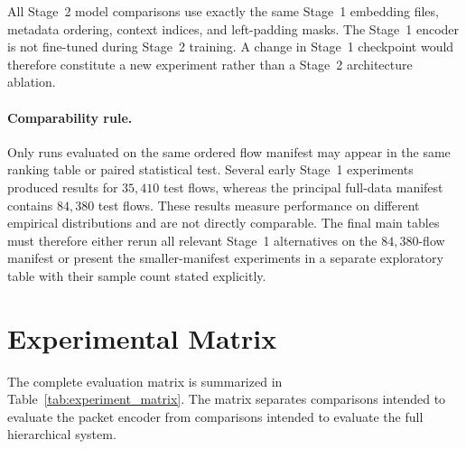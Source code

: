 All Stage~2 model comparisons use exactly the same Stage~1 embedding files,
metadata ordering, context indices, and left-padding masks. The Stage~1 encoder
is not fine-tuned during Stage~2 training. A change in Stage~1 checkpoint would
therefore constitute a new experiment rather than a Stage~2 architecture
ablation.

\paragraph{Comparability rule.}
Only runs evaluated on the same ordered flow manifest may appear in the same
ranking table or paired statistical test. Several early Stage~1 experiments
produced results for $35{,}410$ test flows, whereas the principal full-data
manifest contains $84{,}380$ test flows. These results measure performance on
different empirical distributions and are not directly comparable. The final
main tables must therefore either rerun all relevant Stage~1 alternatives on
the $84{,}380$-flow manifest or present the smaller-manifest experiments in a
separate exploratory table with their sample count stated explicitly.

\section{Experimental Matrix}
\label{subsec:experimental_matrix}

The complete evaluation matrix is summarized in
Table~\ref{tab:experiment_matrix}. The matrix separates comparisons intended
to evaluate the packet encoder from comparisons intended to evaluate the full
hierarchical system.

